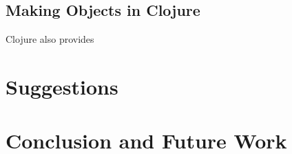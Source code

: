 \documentclass[12pt]{article}
\begin{document}
	\subsection{Making Objects in Clojure}
	Clojure also provides 
	
\section{Suggestions}\label{sec:sugg}

\section{Conclusion and Future Work}\label{sec:con}




%
%

%  
%
%




\end{document}

